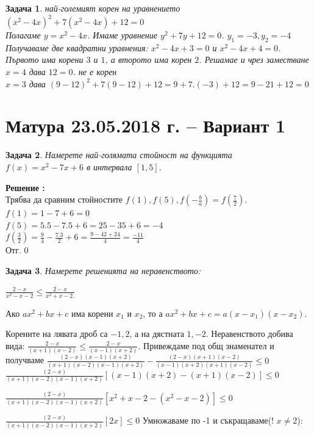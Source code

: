 \documentclass{article}
\newtheorem{problem}{Задача}
\newcounter{solution}
\newcommand\solution{%
	\stepcounter{solution}%
	\textbf{Решение :}\\%
}
\begin{document}
\begin{problem}
	най-големият корен на уравнението $(x^2-4x)^2+ 7(x^2-4x) + 12 =0$  \\
	Полагаме $y = x^2 - 4x $. Имаме уравнение $y^2+7y+12 = 0$. $y_1 = -3, y_2 = -4 $ Получаваме две квадратни уравнения:
	$x^2 - 4x + 3 = 0 $ и $x^2 - 4x + 4 = 0 $. Първото има корени  $3$ и $1$, а второто има корен $2$.
	Решамае и чрез заместване
	$x = 4 $ дава $12 = 0$. не е корен \\
	$x = 3$ дава $(9-12)^2 +7(9-12) + 12 = 9 + 7.(-3) + 12 = 9 - 21 + 12 = 0$
\end{problem}


\section{Матура 23.05.2018 г. – Вариант 1}
\begin{problem}
Намерете най-голямата стойност на функцията  $f(x) = x^2 -7x + 6 $ в интервала 	$[1,5]$. 
\end{problem}
\solution
Трябва да сравним стойностите $f(1), f(5), f(-\frac{b}{a}) = f(\frac{7}{2}) $. \\
$f(1) = 1-7+6 = 0 $ \\
$f(5) = 5.5-7.5+6 =25 -35 + 6 = -4 $ \\
$f(\frac{3}{2}) = \frac{9}{4} -\frac{7.3}{2} + 6 = \frac{9 - 42 + 24}{4} = \frac{-11}{4}$ \\
Отг. 0

\begin{problem}
	Намерете решенията на неравенството:


$\frac{2-x}{x^2-x-2} \leq \frac{2-x}{x^2+x-2.}$ 


\end{problem}
Ако
$a x^2 +bx +c $ има корени $x_1$ и $x_2$, то а
$a x^2 +bx +c = a(x-x_1)(x-x_2)$. 

Корените на лявата дроб са $-1,2$, а на дястната $1,-2 $. 
Неравенството добива вида:
$\frac{2-x}{(x+1)(x-2)} \leq \frac{2-x}{(x-1)(x+2)}$. Привеждаме под общ знаменател и получваме 
$\frac{(2-x)(x-1)(x+2)}{(x+1)(x-2)(x-1)(x+2)} - \frac{(2-x)(x+1)(x-2)}{(x-1)(x+2)(x+1)(x-2)} \leq 0 $ \\

$\frac{(2-x)}{(x+1)(x-2)(x-1)(x+2)}\left[ (x-1)(x+2) - (x+1)(x-2)\right] \leq 0  $

$\frac{(2-x)}{(x+1)(x-2)(x-1)(x+2)}\left[ x^2+x-2 - (x^2-x-2)\right] \leq 0  $


$\frac{(2-x)}{(x+1)(x-2)(x-1)(x+2)}\left[ 2x\right] \leq 0  $
Умножаваме по -1 и съкращаваме(! $x \neq 2 $): \\
\end{document}
